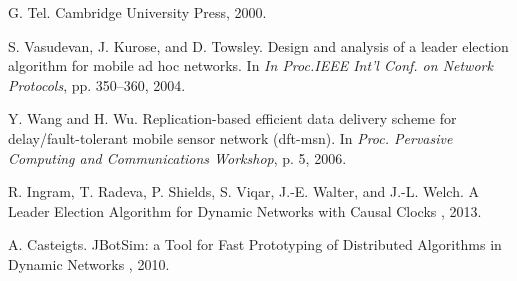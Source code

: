 \documentclass{article}
\begin{document}
\begin{thebibliography}{1}
G. Tel.
\newblock Cambridge University Press, 2000.

S. Vasudevan, J. Kurose, and D. Towsley.
\newblock Design and analysis of a leader election algorithm for mobile ad hoc networks.
\newblock In {\em In Proc.IEEE Int’l Conf. on Network Protocols}, pp. 350–360, 2004.

Y. Wang and H. Wu.
\newblock Replication-based efficient data delivery scheme for delay/fault-tolerant mobile sensor network (dft-msn).
\newblock In {\em Proc. Pervasive Computing and Communications Workshop}, p. 5, 2006.

R. Ingram, T. Radeva, P. Shields, S. Viqar, J.-E. Walter, and J.-L. Welch.
\newblock A Leader Election Algorithm for Dynamic Networks with Causal Clocks
\newblock , 2013.

A. Casteigts.
\newblock JBotSim: a Tool for Fast Prototyping of Distributed Algorithms in Dynamic Networks
\newblock , 2010.


\end{thebibliography}
\end{document}
